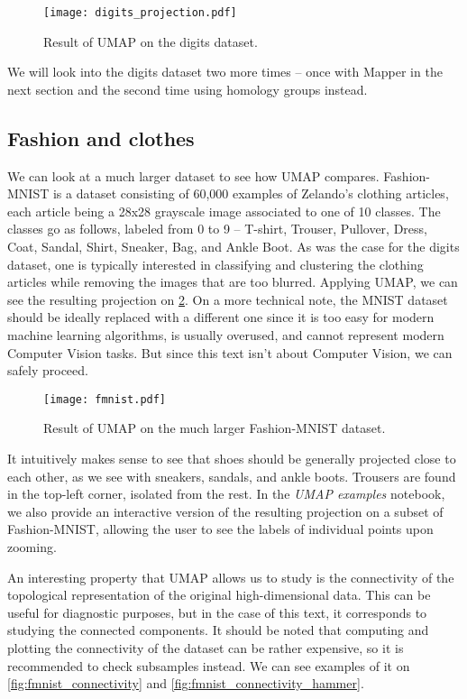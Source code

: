 \begin{figure}[h!]
  \centering
  \texttt{[image: digits\_projection.pdf]}
  \caption{Result of UMAP on the digits dataset.}
  \label{fig:digits_projection}
\end{figure}

We will look into the digits dataset two more times -- once with Mapper in the next section and the second time using homology groups instead.

\subsection{Fashion and clothes}
We can look at a much larger dataset to see how UMAP compares. Fashion-MNIST \cite{DBLP:journals/corr/abs-1708-07747} is a dataset consisting of 60,000 examples of Zelando's clothing articles, each article being a 28x28 grayscale image associated to one of 10 classes. The classes go as follows, labeled from 0 to 9 -- T-shirt, Trouser, Pullover, Dress, Coat, Sandal, Shirt, Sneaker, Bag, and Ankle Boot.
As was the case for the digits dataset, one is typically interested in classifying and clustering the clothing articles while removing the images that are too blurred. Applying UMAP, we can see the resulting projection on \ref{fig:fmnist}. On a more technical note, the MNIST dataset should be ideally replaced with a different one since it is too easy for modern machine learning algorithms, is usually overused, and cannot represent modern Computer Vision tasks. But since this text isn't about Computer Vision, we can safely proceed.

\begin{figure}[h!]
  \centering
  \texttt{[image: fmnist.pdf]}
  \caption{Result of UMAP on the much larger Fashion-MNIST dataset.}
  \label{fig:fmnist}
\end{figure}

It intuitively makes sense to see that shoes should be generally projected close to each other, as we see with sneakers, sandals, and ankle boots. Trousers are found in the top-left corner, isolated from the rest. In the \textit{UMAP examples} notebook, we also provide an interactive version of the resulting projection on a subset of Fashion-MNIST, allowing the user to see the labels of individual points upon zooming.

An interesting property that UMAP allows us to study is the connectivity of the topological representation of the original high-dimensional data. This can be useful for diagnostic purposes, but in the case of this text, it corresponds to studying the connected components. It should be noted that computing and plotting the connectivity of the dataset can be rather expensive, so it is recommended to check subsamples instead. We can see examples of it on \ref{fig:fmnist_connectivity} and \ref{fig:fmnist_connectivity_hammer}.

